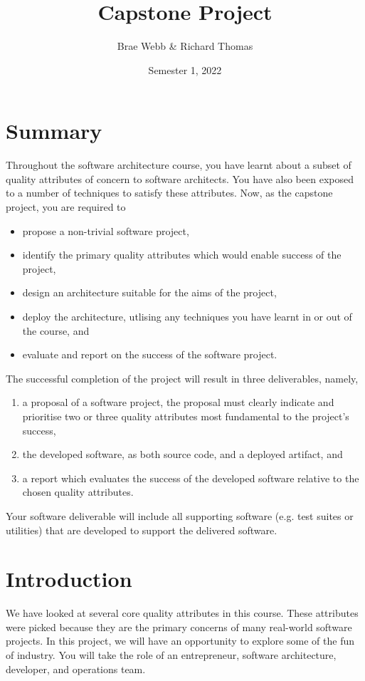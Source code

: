 \documentclass{csse4400}
\title{Capstone Project}
\author{Brae Webb \& Richard Thomas}
\date{Semester 1, 2022}
\begin{document}
\maketitle

\section*{Summary}
Throughout the software architecture course,
you have learnt about a subset of quality attributes of concern to software architects.
You have also been exposed to a number of techniques to satisfy these attributes.
Now, as the capstone project, you are required to
\begin{itemize}
    \item propose a non-trivial software project,
    \item identify the primary quality attributes which would enable success of the project,
    \item design an architecture suitable for the aims of the project,
    \item deploy the architecture, utlising any techniques you have learnt in or out of the course, and
    \item evaluate and report on the success of the software project.
\end{itemize}

\noindent
The successful completion of the project will result in three deliverables, namely,
\begin{enumerate}[label=\roman*]
    \item a proposal of a software project, the proposal must clearly indicate and prioritise two or three quality attributes most {\color{red} fundamental} to the project's success,
    \item the developed software, as both source code, and a deployed artifact, and
    \item a report which evaluates the success of the developed software relative to the chosen quality attributes.
\end{enumerate}

\noindent
Your software deliverable will include all supporting software (e.g. test suites or utilities) that are developed to support the delivered software.

\section{Introduction}
We have looked at several core quality attributes in this course.
These attributes were picked because they are the primary concerns of many real-world software projects.
In this project, we will have an opportunity to explore some of the fun of industry.
You will take the role of an entrepreneur, software architecture, developer, and operations team.
\end{document}
